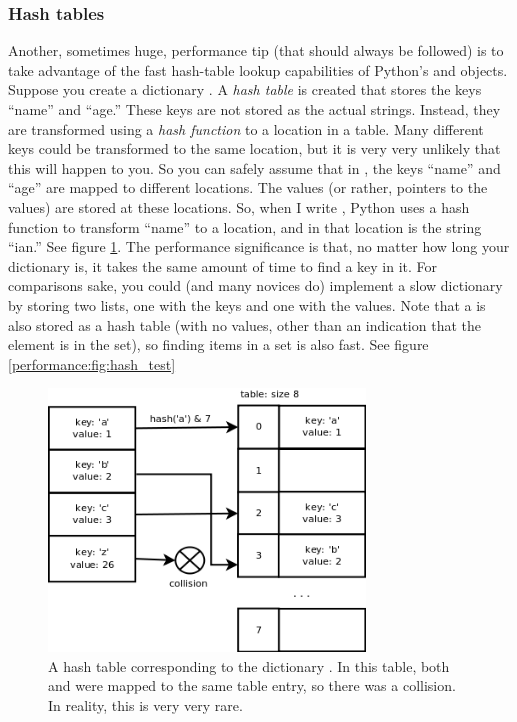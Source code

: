 \subsubsection{Hash tables}
Another, sometimes huge, performance tip (that should always be followed) is to take advantage of the fast hash-table lookup capabilities of Python's  and  objects.  Suppose you create a dictionary .  A \emph{hash table} is created that stores the keys ``name'' and ``age.''  These keys are not stored as the actual strings.  Instead, they are transformed using a \emph{hash function} to a location in a table.  Many different keys could be transformed to the same location, but it is very very unlikely that this will happen to you.  So you can safely assume that in , the keys ``name'' and ``age'' are mapped to different locations.  The values (or rather, pointers to the values) are stored at these locations.  So, when I write , Python uses a hash function to transform ``name'' to a location, and in that location is the string ``ian.''  See figure \ref{performance:fig:hash}.  The performance significance is that, no matter how long your dictionary is, it takes the same amount of time to find a key in it.  For comparisons sake, you could (and many novices do) implement a slow dictionary by storing two lists, one with the keys and one with the values.  Note that a  is also stored as a hash table (with no values, other than an indication that the element is in the set), so finding items in a set is also fast.  See figure \ref{performance:fig:hash_test}
\begin{figure}
  \includegraphics[width=0.75\textwidth]{../images/hash}
  \caption{A hash table corresponding to the dictionary .  In this table, both  and  were mapped to the same table entry, so there was a collision.  In reality, this is very very rare.}
  \label{performance:fig:hash}
\end{figure}
